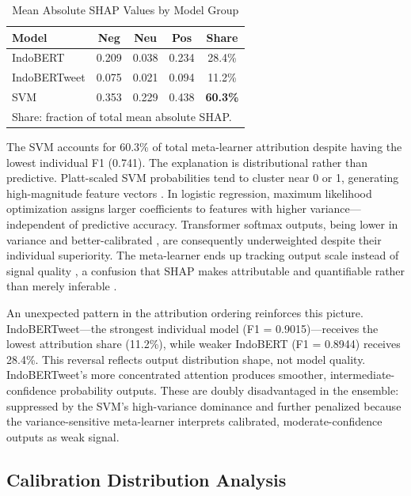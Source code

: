 \documentclass[conference]{IEEEtran}
\begin{document}
\begin{table}[htbp]
\caption{Mean Absolute SHAP Values by Model Group}
\label{tab:shap_values}
\begin{center}
\begin{tabular}{lcccc}
\toprule
\textbf{Model} & \textbf{Neg} & \textbf{Neu} & \textbf{Pos} & \textbf{Share} \\
\midrule
IndoBERT     & 0.209 & 0.038 & 0.234 & 28.4\% \\
IndoBERTweet & 0.075 & 0.021 & 0.094 & 11.2\% \\
SVM          & 0.353 & 0.229 & 0.438 & \textbf{60.3\%} \\
\bottomrule
\multicolumn{5}{l}{\footnotesize Share: fraction of total mean absolute SHAP.}
\end{tabular}
\end{center}
\end{table}

The SVM accounts for 60.3\% of total meta-learner attribution despite having the lowest individual F1 (0.741). The explanation is distributional rather than predictive. Platt-scaled SVM probabilities tend to cluster near 0 or 1, generating high-magnitude feature vectors \cite{b15}. In logistic regression, maximum likelihood optimization assigns larger coefficients to features with higher variance---independent of predictive accuracy. Transformer softmax outputs, being lower in variance and better-calibrated \cite{b15,b18}, are consequently underweighted despite their individual superiority. The meta-learner ends up tracking output scale instead of signal quality \cite{b17,b18}, a confusion that SHAP makes attributable and quantifiable rather than merely inferable \cite{b20}.

An unexpected pattern in the attribution ordering reinforces this picture. IndoBERTweet---the strongest individual model (F1 = 0.9015)---receives the lowest attribution share (11.2\%), while weaker IndoBERT (F1 = 0.8944) receives 28.4\%. This reversal reflects output distribution shape, not model quality. IndoBERTweet's more concentrated attention produces smoother, intermediate-confidence probability outputs. These are doubly disadvantaged in the ensemble: suppressed by the SVM's high-variance dominance and further penalized because the variance-sensitive meta-learner interprets calibrated, moderate-confidence outputs as weak signal.

\subsection{Calibration Distribution Analysis}
\end{document}
